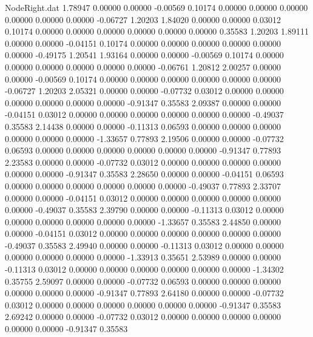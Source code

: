 \begin{filecontents}{NodeRight.dat}
   1.78947    0.00000    0.00000    -0.00569    0.10174    0.00000    0.00000    0.00000    0.00000    0.00000    0.00000   -0.06727    1.20203
   1.84020    0.00000    0.00000     0.03012    0.10174    0.00000    0.00000    0.00000    0.00000    0.00000    0.00000    0.35583    1.20203
   1.89111    0.00000    0.00000    -0.04151    0.10174    0.00000    0.00000    0.00000    0.00000    0.00000    0.00000   -0.49175    1.20541
   1.93164    0.00000    0.00000    -0.00569    0.10174    0.00000    0.00000    0.00000    0.00000    0.00000    0.00000   -0.06761    1.20812
   2.00257    0.00000    0.00000    -0.00569    0.10174    0.00000    0.00000    0.00000    0.00000    0.00000    0.00000   -0.06727    1.20203
   2.05321    0.00000    0.00000    -0.07732    0.03012    0.00000    0.00000    0.00000    0.00000    0.00000    0.00000   -0.91347    0.35583
   2.09387    0.00000    0.00000    -0.04151    0.03012    0.00000    0.00000    0.00000    0.00000    0.00000    0.00000   -0.49037    0.35583
   2.14438    0.00000    0.00000    -0.11313    0.06593    0.00000    0.00000    0.00000    0.00000    0.00000    0.00000   -1.33657    0.77893
   2.19506    0.00000    0.00000    -0.07732    0.06593    0.00000    0.00000    0.00000    0.00000    0.00000    0.00000   -0.91347    0.77893
   2.23583    0.00000    0.00000    -0.07732    0.03012    0.00000    0.00000    0.00000    0.00000    0.00000    0.00000   -0.91347    0.35583
   2.28650    0.00000    0.00000    -0.04151    0.06593    0.00000    0.00000    0.00000    0.00000    0.00000    0.00000   -0.49037    0.77893
   2.33707    0.00000    0.00000    -0.04151    0.03012    0.00000    0.00000    0.00000    0.00000    0.00000    0.00000   -0.49037    0.35583
   2.39790    0.00000    0.00000    -0.11313    0.03012    0.00000    0.00000    0.00000    0.00000    0.00000    0.00000   -1.33657    0.35583
   2.44850    0.00000    0.00000    -0.04151    0.03012    0.00000    0.00000    0.00000    0.00000    0.00000    0.00000   -0.49037    0.35583
   2.49940    0.00000    0.00000    -0.11313    0.03012    0.00000    0.00000    0.00000    0.00000    0.00000    0.00000   -1.33913    0.35651
   2.53989    0.00000    0.00000    -0.11313    0.03012    0.00000    0.00000    0.00000    0.00000    0.00000    0.00000   -1.34302    0.35755
   2.59097    0.00000    0.00000    -0.07732    0.06593    0.00000    0.00000    0.00000    0.00000    0.00000    0.00000   -0.91347    0.77893
   2.64180    0.00000    0.00000    -0.07732    0.03012    0.00000    0.00000    0.00000    0.00000    0.00000    0.00000   -0.91347    0.35583
   2.69242    0.00000    0.00000    -0.07732    0.03012    0.00000    0.00000    0.00000    0.00000    0.00000    0.00000   -0.91347    0.35583

\end{filecontents}
